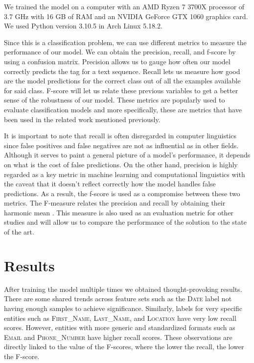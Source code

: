   We trained the model on a computer with an AMD Ryzen 7 3700X processor of 3.7
  GHz with 16 GB of RAM and an NVIDIA GeForce GTX 1060 graphics card. We used
  Python version 3.10.5 in Arch Linux 5.18.2.

  Since this is a classification problem, we can use different metrics to
  measure the performance of our model. We can obtain the precision, recall,
  and f-score by using a confusion matrix. Precision allows us to gauge how
  often our model correctly predicts the tag for a text sequence. Recall lets
  us measure how good are the model predictions for the correct class out of
  all the examples available for said class. F-score will let us relate these
  previous variables to get a better sense of the robustness of our model.
  These metrics are popularly used to evaluate classification models and more
  specifically, these are metrics that have been used in the related work
  mentioned previously.

  It is important to note that recall is often disregarded in computer
  linguistics since false positives and false negatives are not as influential
  as in other fields. Although it serves to paint a general picture of a
  model's performance, it depends on what is the cost of false predictions. On
  the other hand, precision is highly regarded as a key metric in machine
  learning and computational linguistics with the caveat that it doesn't
  reflect correctly how the model handles false predictions. As a result, the
  f-score is used as a compromise between these two metrics. The F-measure
  relates the precision and recall by obtaining their harmonic mean
  \cite{Powers2020}. This measure is also used as an evaluation metric for
  other studies and will allow us to compare the performance of the solution to
  the state of the art.


\chapter{Results} %

\label{Cap6} %


  After training the model multiple times we obtained thought-provoking
  results. There are some shared trends across feature sets such as the
  \textsc{Date} label not having enough samples to achieve significance.
  Similarly, labels for very specific entities such as \textsc{First\_Name},
  \textsc{Last\_Name}, and \textsc{Location} have very low recall scores.
  However, entities with more generic and standardized formats such as
  \textsc{Email} and \textsc{Phone\_Number} have higher recall scores. These
  observations are directly linked to the value of the F-scores, where the
  lower the recall, the lower the F-score.

